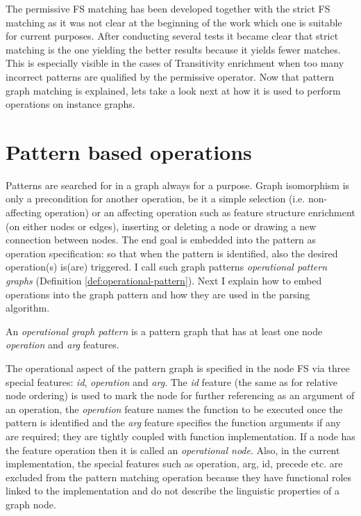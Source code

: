    The permissive FS matching has been developed together with the strict FS matching as it was not clear at the beginning of the work which one is suitable for current purposes. After conducting several tests it became clear that strict matching is the one yielding the better results because it yields fewer matches. This is especially visible in the cases of Transitivity enrichment when too many incorrect patterns are qualified by the permissive operator. Now that pattern graph matching is explained, lets take a look next at how it is used to perform operations on instance graphs.

\section{Pattern based operations}
\label{sec:pattern-based-operations}

    Patterns are searched for in a graph always for a purpose. Graph isomorphism is only a precondition for another operation, be it a simple selection (i.e. non-affecting operation) or an affecting operation such as feature structure enrichment (on either nodes or edges), inserting or deleting a node or drawing a new connection between nodes. The end goal is embedded into the pattern as operation specification: so that when the pattern is identified, also the desired operation(s) is(are) triggered. I call such graph patterns \textit{operational pattern graphs} (Definition \ref{def:operational-pattern}). Next I explain how to embed  operations into the graph pattern and how they are used in the parsing algorithm. 

        \begin{definition}\label{def:operational-pattern}
            An \textit{operational graph pattern} is a pattern graph that has at least one node \textit{operation} and \textit{arg} features.
        \end{definition}

    The operational aspect of the pattern graph is specified in the node FS via three special features: \textit{id}, \textit{operation} and \textit{arg}. The \textit{id} feature (the same as for relative node ordering) is used to mark the node for further referencing as an argument of an operation, the \textit{operation} feature names the function to be executed once the pattern is identified and the \textit{arg} feature specifies the function arguments if any are required; they are tightly coupled with function implementation. If a node has the feature operation then it is called an \textit{operational node}. Also, in the current implementation, the special features such as operation, arg, id, precede etc. are excluded from the pattern matching operation because they have functional roles linked to the implementation and do not describe the linguistic properties of a graph node.

